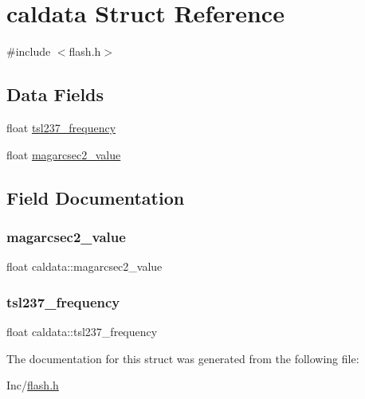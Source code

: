 \hypertarget{structcaldata}{}\section{caldata Struct Reference}
\label{structcaldata}


{\ttfamily \#include $<$flash.\+h$>$}

\subsection*{Data Fields}
\begin{DoxyCompactItemize}
\item 
float \hyperlink{structcaldata_af254a1ab613664d4b9929c6e221cb1a1}{tsl237\+\_\+frequency}
\item 
float \hyperlink{structcaldata_a2ec0b5d4ce00ec6d1cc314a4b3bdfd3b}{magarcsec2\+\_\+value}
\end{DoxyCompactItemize}


\subsection{Field Documentation}
\mbox{\label{structcaldata_a2ec0b5d4ce00ec6d1cc314a4b3bdfd3b}} 
\subsubsection{\texorpdfstring{magarcsec2\+\_\+value}{magarcsec2\_value}}
{\footnotesize\ttfamily float caldata\+::magarcsec2\+\_\+value}

\mbox{\label{structcaldata_af254a1ab613664d4b9929c6e221cb1a1}} 
\subsubsection{\texorpdfstring{tsl237\+\_\+frequency}{tsl237\_frequency}}
{\footnotesize\ttfamily float caldata\+::tsl237\+\_\+frequency}



The documentation for this struct was generated from the following file\+:\begin{DoxyCompactItemize}
\item 
Inc/\hyperlink{flash_8h}{flash.\+h}\end{DoxyCompactItemize}
